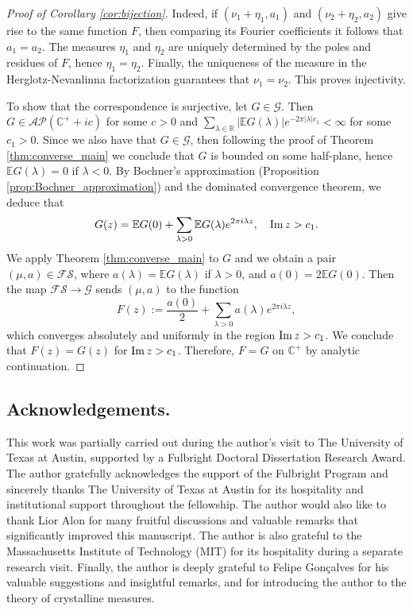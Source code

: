 \documentclass[a4paper,reqno,12pt]{amsart}
\newcommand{\A}{\mathcal{A}}
\newcommand{\F}{\mathcal{F}}
\newcommand{\G}{\mathcal{G}}
\renewcommand{\P}{\mathcal{P}}
\renewcommand{\S}{\mathcal{S}}
\renewcommand{\r}{\mathbb{R}}
\newcommand{\cp}{\mathbb{C}} %
\newcommand{\la}{\lambda}
\newcommand{\1}{{\bf 1}}
\newcommand{\ra}{\rightarrow}
\newcommand{\e}{\mathbb{E}}
\renewcommand{\Im}{{\rm Im}\,}
\begin{document}
\begin{proof}[Proof of Corollary \ref{cor:bijection}]
Indeed, if $(\nu_1+\eta_1,a_1)$ and $(\nu_2+\eta_2,a_2)$ give rise to the same function $F$, then comparing its Fourier coefficients it follows that $a_1=a_2$. The measures $\eta_1$ and $\eta_2$ are uniquely determined by the poles and residues of $F$, hence $\eta_1=\eta_2$. Finally, the uniqueness of the measure in the Herglotz-Nevanlinna factorization guarantees that $\nu_1=\nu_2$. This proves injectivity.

To show that the correspondence is surjective, let $G\in\G$. Then $G\in\A\P(\cp^++ic)$ for some $c>0$ and $\sum_{\la\in\r} |\e G(\la)| e^{-2\pi|\la|c_1}<\infty$ for some $c_1>0$. Since we also have that $G\in\G$, then following the proof of Theorem \ref{thm:converse_main} we conclude that $G$ is bounded on some half-plane, hence $\e G(\la)=0$ if $\la<0$. By Bochner's approximation (Proposition \ref{prop:Bochner_approximation}) and the dominated convergence theorem, we deduce that
\begin{equation*}
    G(z)=\e G(0)+\sum_{\la>0} \e G(\la) e^{2\pi i\la z},\quad \Im{z}>c_1.
\end{equation*}
We apply Theorem \ref{thm:converse_main} to $G$ and we obtain a pair $(\mu,a)\in\F\S$, where $a(\la)=\e G(\la)$ if $\la>0$, and $a(0)=2 \e G(0)$. Then the map $\F\S\ra\G$ sends $(\mu,a)$ to the function
\begin{equation*}
    F(z):=\frac{a(0)}{2}+\sum_{\la>0} a(\la)e^{2\pi i\la z},
\end{equation*}
which converges absolutely and uniformly in the region $\Im{z}>c_1$. We conclude that $F(z)=G(z)$ for $\Im{z}>c_1$. Therefore, $F=G$ on $\cp^+$ by analytic continuation.
\end{proof}

\subsection*{Acknowledgements.} This work was partially carried out during the author's visit to The University of Texas at Austin, supported by a Fulbright Doctoral Dissertation Research Award. The author gratefully acknowledges the support of the Fulbright Program and sincerely thanks The University of Texas at Austin for its hospitality and institutional support throughout the fellowship. The author would also like to thank Lior Alon for many fruitful discussions and valuable remarks that significantly improved this manuscript. The author is also grateful to the Massachusetts Institute of Technology (MIT) for its hospitality during a separate research visit. Finally, the author is deeply grateful to Felipe Gonçalves for his valuable suggestions and insightful remarks, and for introducing the author to the theory of crystalline measures.
\end{document}
